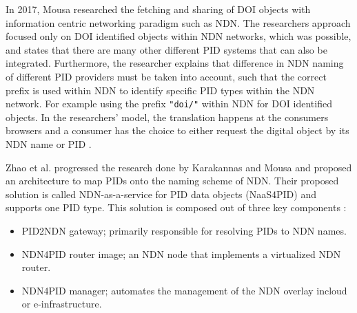 In 2017, Mousa researched the fetching and sharing of DOI objects with information centric networking paradigm such as NDN. 
The researchers approach focused only on DOI identified objects within NDN networks, which was possible, and states that there are many other different PID systems that can also be integrated. Furthermore, the researcher explains that difference in NDN naming of different PID providers must be taken into account, such that the correct prefix is used within NDN to identify specific PID types within the NDN network. For example using the prefix \texttt{"doi/"} within NDN for DOI identified objects. 
In the researchers' model, the translation happens at the consumers browsers and a consumer has the choice to either request the digital object by its NDN name or PID \cite{ndn-app-aware}.

Zhao et al. progressed the research done by Karakannas and Mousa and proposed an architecture to map PIDs onto the naming scheme of NDN. Their proposed solution is called NDN-as-a-service for PID data objects (NaaS4PID) and supports one PID type. This solution is composed out of three key components \cite{icn-resteam}:
\begin{itemize}
  \item PID2NDN gateway; primarily responsible for resolving PIDs to NDN names.
  \item NDN4PID router image; an NDN node that implements a virtualized NDN router.
  \item NDN4PID manager; automates the management of the NDN overlay in\newline cloud or e-infrastructure.
\end{itemize}

